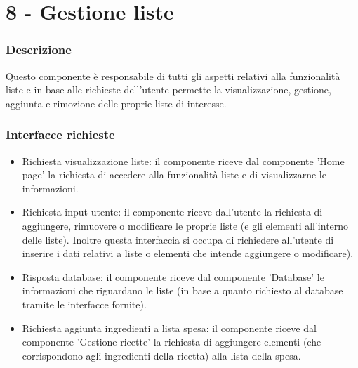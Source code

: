 \documentclass[a4paper,12pt]{article}
\begin{document}
\section*{8 -  Gestione liste}
\subsubsection*{Descrizione}
Questo componente è responsabile di tutti gli aspetti relativi alla funzionalità liste e in base alle richieste dell'utente permette la visualizzazione, gestione, aggiunta e rimozione delle proprie liste di interesse.
\subsubsection*{Interfacce richieste}
\begin{itemize} \setlength\itemsep{0.01em}
\item {\sffamily Richiesta visualizzazione liste}: il componente riceve dal componente 'Home page'  la richiesta di accedere alla funzionalità liste e di visualizzarne le informazioni.
\item {\sffamily Richiesta input utente}: il componente riceve dall'utente la richiesta di aggiungere, rimuovere o modificare le proprie liste (e gli elementi all'interno delle liste). Inoltre questa interfaccia si occupa di richiedere all'utente di inserire i dati relativi a liste o elementi che intende aggiungere o modificare).
\item {\sffamily Risposta database}: il componente riceve dal componente 'Database' le informazioni che riguardano le liste (in base a quanto richiesto al database tramite le interfacce fornite).
\item {\sffamily Richiesta aggiunta ingredienti a lista spesa}: il componente riceve dal componente 'Gestione ricette' la richiesta di aggiungere elementi (che corrispondono agli ingredienti della ricetta) alla lista della spesa.

\end{itemize}
\end{document}

